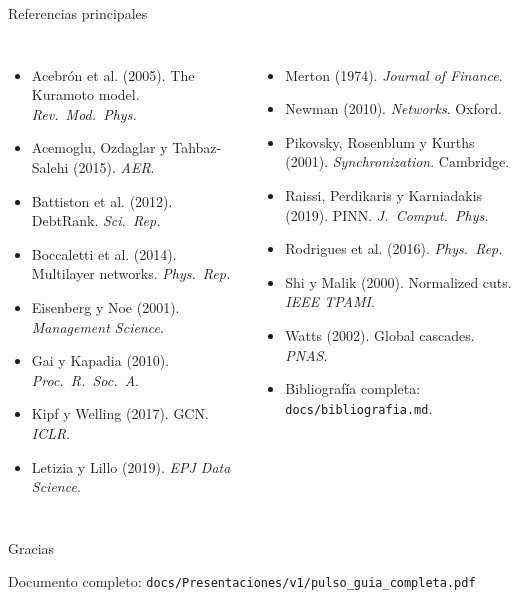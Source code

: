 \documentclass[aspectratio=169,10pt]{beamer}
\begin{document}
\begin{frame}{Referencias principales}
\scriptsize
\begin{columns}[T]
\begin{itemize}
\item Acebrón et al. (2005). The Kuramoto model. \emph{Rev.\ Mod.\ Phys.}
\item Acemoglu, Ozdaglar y Tahbaz-Salehi (2015). \emph{AER}.
\item Battiston et al. (2012). DebtRank. \emph{Sci.\ Rep.}
\item Boccaletti et al. (2014). Multilayer networks. \emph{Phys.\ Rep.}
\item Eisenberg y Noe (2001). \emph{Management Science}.
\item Gai y Kapadia (2010). \emph{Proc.\ R.\ Soc.\ A}.
\item Kipf y Welling (2017). GCN. \emph{ICLR}.
\item Letizia y Lillo (2019). \emph{EPJ Data Science}.
\end{itemize}
\begin{itemize}
\item Merton (1974). \emph{Journal of Finance}.
\item Newman (2010). \emph{Networks}. Oxford.
\item Pikovsky, Rosenblum y Kurths (2001). \emph{Synchronization}. Cambridge.
\item Raissi, Perdikaris y Karniadakis (2019). PINN. \emph{J.\ Comput.\ Phys.}
\item Rodrigues et al. (2016). \emph{Phys.\ Rep.}
\item Shi y Malik (2000). Normalized cuts. \emph{IEEE TPAMI}.
\item Watts (2002). Global cascades. \emph{PNAS}.
\item Bibliografía completa: \texttt{docs/bibliografia.md}.
\end{itemize}
\end{columns}
\end{frame}

\begin{frame}[standout]
Gracias

\vspace{0.4cm}
\normalsize Documento completo: \texttt{docs/Presentaciones/v1/pulso\_guia\_completa.pdf}
\end{frame}
\end{document}
